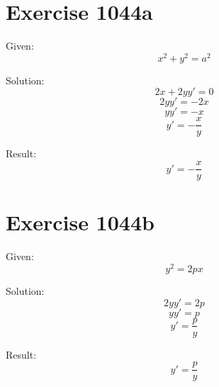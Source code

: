 \documentclass[a4paper, 10pt]{scrartcl}
\begin{document}
\section{Exercise 1044a}

Given:
\[
x^{2} + y^{2} = a^{2}
\]

Solution:
\[
2x + 2yy' = 0
\]
\[
2yy' = -2x
\]
\[
yy' = -x
\]
\[
y' = -\frac{x}{y}
\]

Result:
\[
y' = -\frac{x}{y}
\]

\section{Exercise 1044b}

Given:
\[
y^{2} = 2px
\]

Solution:
\[
2yy' = 2p
\]
\[
yy' = p
\]
\[
y' = \frac{p}{y}
\]

Result:
\[
y' = \frac{p}{y}
\]
\end{document}
